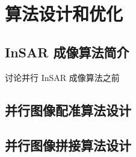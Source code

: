 \chapter{算法设计和优化}

\section{InSAR 成像算法简介}

讨论并行 InSAR 成像算法之前

\section{并行图像配准算法设计}

\section{并行图像拼接算法设计}
